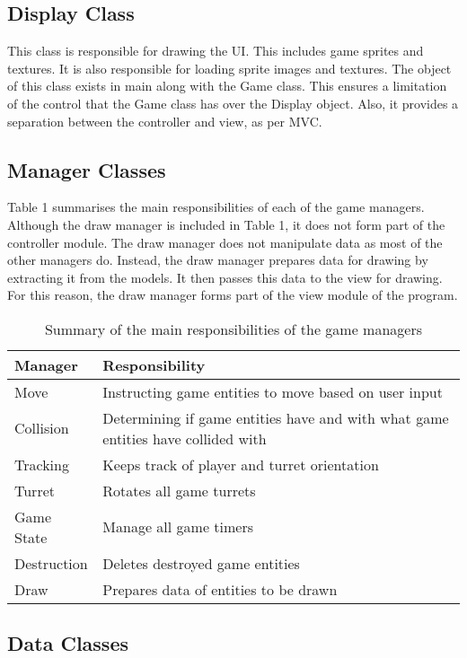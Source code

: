 \documentclass[10pt,twocolumn]{witseiepaper}
\begin{document}
\subsection{Display Class}
This class is responsible for drawing the UI. This includes game sprites and textures. It is also responsible for loading sprite images and textures. The object of this class exists in main along with the Game class. This ensures a limitation of the control that the Game class has over the Display object. Also, it provides a separation between the controller and view, as per MVC.

\subsection{Manager Classes}
Table 1 summarises the main responsibilities of each of the game managers. Although the draw manager is included in Table 1, it does not form part of the controller module. The draw manager does not manipulate data as most of the other managers do. Instead, the draw manager prepares data for drawing by extracting it from the models. It then passes this data to the view for drawing. For this reason, the draw manager forms part of the view module of the program. 
\begin{table}[h]
	\centering
	\caption{Summary of the main responsibilities of the game managers}
	\begin{tabular}{|>{\centering\arraybackslash}m{2cm}|>{\centering\arraybackslash}m{4.5cm}|}
		\hline 
		\textbf{Manager} & \textbf{Responsibility} \\ 
		\hline 
		Move & Instructing game entities to move based on user input \\ 
		\hline 
		Collision & Determining if game entities have and with what game 								entities have collided with \\ 
		\hline 
		Tracking & Keeps track of player and turret orientation \\ 
		\hline 
		Turret & Rotates all game turrets \\ 
		\hline 
		Game State & Manage all game timers \\ 
		\hline 
		Destruction & Deletes destroyed game entities \\ 
		\hline 
		Draw & Prepares data of entities to be drawn \\ 
		\hline 
	\end{tabular} 
\end{table}

\subsection{Data Classes}
\end{document}

